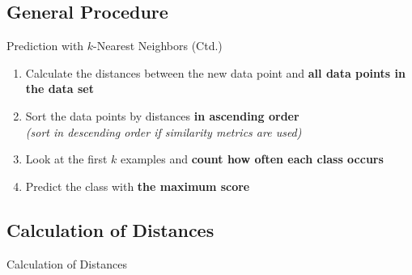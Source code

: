 \subsection{General Procedure}

\begin{frame}{Prediction with $k$-Nearest Neighbors (Ctd.)}{}
	\begin{enumerate}
		\item Calculate the distances between the new data point and \textbf{all data points in the data set}
		\item Sort the data points by distances \textbf{in ascending order} \\
			{\footnotesize \textit{(sort in descending order if similarity metrics are used)}}
		\item Look at the first $k$ examples and \textbf{count how often each class occurs}
		\item Predict the class with \textbf{the maximum score}
	\end{enumerate}
\end{frame}


\subsection{Calculation of Distances}

\begin{frame}{ Calculation of Distances}{}
\end{frame}


